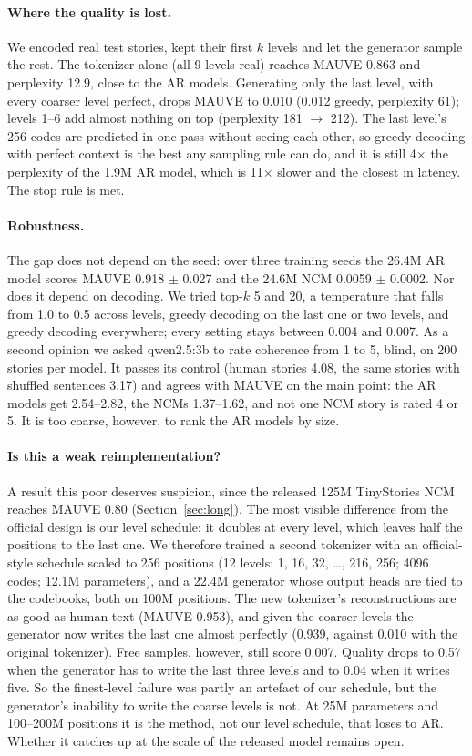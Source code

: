 \documentclass[11pt]{article}
\begin{document}
\paragraph{Where the quality is lost.} We encoded real test stories, kept their first $k$
levels and let the generator sample the rest. The tokenizer alone (all 9 levels real)
reaches MAUVE 0.863 and perplexity 12.9, close to the AR models. Generating only the last
level, with every coarser level perfect, drops MAUVE to 0.010 (0.012 greedy, perplexity 61);
levels 1--6 add almost nothing on top (perplexity 181 $\to$ 212). The last level's 256 codes
are predicted in one pass without seeing each other, so greedy decoding with perfect context
is the best any sampling rule can do, and it is still 4$\times$ the perplexity of the 1.9M AR
model, which is 11$\times$ slower and the closest in latency. The stop rule is met.

\paragraph{Robustness.} The gap does not depend on the seed: over three training seeds the
26.4M AR model scores MAUVE 0.918 $\pm$ 0.027 and the 24.6M NCM 0.0059 $\pm$ 0.0002. Nor does
it depend on decoding. We tried top-$k$ 5 and 20, a temperature that falls from 1.0 to 0.5
across levels, greedy decoding on the last one or two levels, and greedy decoding everywhere;
every setting stays between 0.004 and 0.007. As a second opinion we asked qwen2.5:3b to rate
coherence from 1 to 5, blind, on 200 stories per model. It passes its control (human stories
4.08, the same stories with shuffled sentences 3.17) and agrees with MAUVE on the main point:
the AR models get 2.54--2.82, the NCMs 1.37--1.62, and not one NCM story is rated 4 or 5. It is
too coarse, however, to rank the AR models by size.

\paragraph{Is this a weak reimplementation?} A result this poor deserves suspicion, since the
released 125M TinyStories NCM reaches MAUVE 0.80 (Section~\ref{sec:long}). The most visible
difference from the official design is our level schedule: it doubles at every level, which
leaves half the positions to the last one. We therefore trained a second tokenizer with an
official-style schedule scaled to 256 positions (12 levels: 1, 16, 32, \dots, 216, 256; 4096
codes; 12.1M parameters), and a 22.4M generator whose output heads are tied to the codebooks,
both on 100M positions. The new tokenizer's reconstructions are as good as human text (MAUVE
0.953), and given the coarser levels the generator now writes the last one almost perfectly
(0.939, against 0.010 with the original tokenizer). Free samples, however, still score 0.007.
Quality drops to 0.57 when the generator has to write the last three levels and to 0.04 when it
writes five. So the finest-level failure was partly an artefact of our schedule, but the
generator's inability to write the coarse levels is not. At 25M parameters and 100--200M
positions it is the method, not our level schedule, that loses to AR. Whether it catches up at
the scale of the released model remains open.
\end{document}
